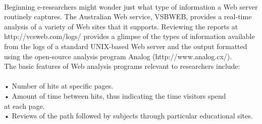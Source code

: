 \documentclass{book}
\begin{document}
\\\hspace*{0.5cm}Beginning e-researchers might wonder just what type of information a Web server routinely captures. The Australian Web service, VSBWEB, provides a real-time analysis of a variety of Web sites that it supports. Reviewing the reports at http://vcsweb.com/logs/ provides a glimpse of the types of information available from the logs of a standard UNIX-based Web server and the output formatted using the open-source analysis program Analog (http://www.analog.cx/).
\\\hspace*{0.5cm}The basic features of Web analysis programs relevant to researchers include:\\

\\\hspace*{0.5cm}• Number of hits at specific pages.
\\\hspace*{0.5cm}• Amount of time between hits, thus indicating the time visitors spend
\\\hspace*{0.5cm}at each page.
\\\hspace*{0.5cm}• Reviews of the path followed by subjects through particular educational sites.
\end{document}
